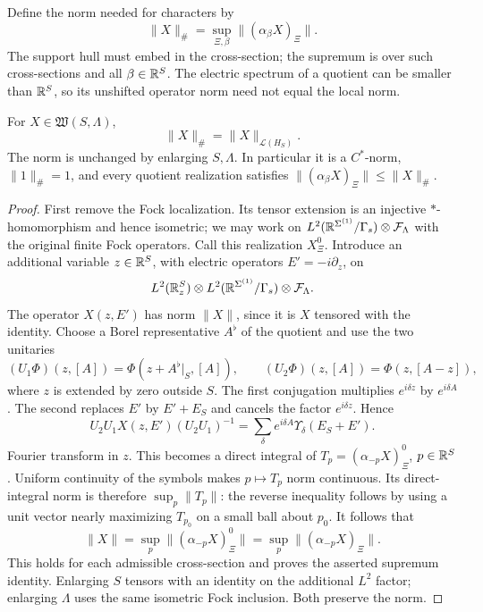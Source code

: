 Define the norm needed for characters by
\begin{equation}\label{eq:diag-sharp-norm}
 \|X\|_\#=\sup_{\Xi,\beta}\| (\alpha_\beta X)_\Xi\|.
\end{equation}
The support hull must embed in the cross-section; the supremum is
over such cross-sections and all $\beta\in\mathbb R^S$. The electric spectrum
of a quotient can be smaller than $\mathbb R^S$, so its unshifted operator
norm need not equal the local norm.

\begin{proposition}\label{prop:diag-local-norm}
For $X\in\mathfrak W(S,\Lambda)$,
\[
 \|X\|_\#=\|X\|_{\mathcal L(H_S)}.
\]
The norm is unchanged by enlarging $S,\Lambda$. In particular it is
a $C^*$-norm, $\|1\|_\#=1$, and every quotient realization satisfies
$\|(\alpha_\beta X)_\Xi\|\le\|X\|_\#$.
\end{proposition}

\begin{proof}
First remove the Fock localization. Its tensor extension is an
injective $*$-homomorphism and hence isometric; we may work on
$L^2(\mathbb R^{\Sigma^{(1)}}/\Gamma_s)\otimes\mathcal F_\Lambda$ with the
original finite Fock operators. Call this realization $X_\Xi^0$.
Introduce an additional variable $z\in\mathbb R^S$, with electric operators
$E'=-i\partial_z$, on
\[
 L^2(\mathbb R^S_z)\otimes
 L^2(\mathbb R^{\Sigma^{(1)}}/\Gamma_s)\otimes\mathcal F_\Lambda.
\]
The operator $X(z,E')$ has norm $\|X\|$, since it is $X$ tensored
with the identity. Choose a Borel representative $A^\flat$ of the
quotient and use the two unitaries
\[
 (U_1\Phi)(z,[A])=\Phi(z+A^\flat|_S,[A]),\qquad
 (U_2\Phi)(z,[A])=\Phi(z,[A-z]),
\]
where $z$ is extended by zero outside $S$. The first conjugation
multiplies $e^{i\delta z}$ by $e^{i\delta A}$. The second replaces
$E'$ by $E'+E_S$ and cancels the factor $e^{i\delta z}$. Hence
\[
 U_2U_1X(z,E')(U_2U_1)^{-1}
       =\sum_\delta e^{i\delta A}\Upsilon_\delta(E_S+E').
\]
Fourier transform in $z$. This becomes a direct integral of
$T_p=(\alpha_{-p}X)_\Xi^0$, $p\in\mathbb R^S$. Uniform continuity of the
symbols makes $p\mapsto T_p$ norm continuous. Its direct-integral
norm is therefore $\sup_p\|T_p\|$: the reverse inequality follows
by using a unit vector nearly maximizing $T_{p_0}$ on a small ball
about $p_0$. It follows that
\[
 \|X\|=\sup_p\| (\alpha_{-p}X)_\Xi^0\|
        =\sup_p\| (\alpha_{-p}X)_\Xi\|.
\]
This holds for each admissible cross-section and proves the asserted
supremum identity. Enlarging $S$ tensors with an identity on the
additional $L^2$ factor; enlarging $\Lambda$ uses the same isometric
Fock inclusion. Both preserve the norm.
\end{proof}

